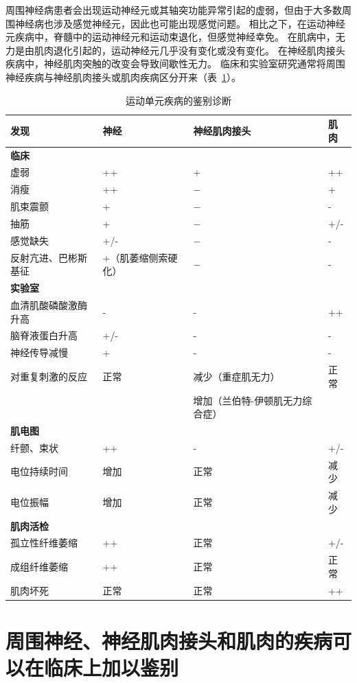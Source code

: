 周围神经病患者会出现运动神经元或其轴突功能异常引起的虚弱，但由于大多数周围神经病也涉及感觉神经元，因此也可能出现感觉问题。
相比之下，在运动神经元疾病中，脊髓中的运动神经元和运动束退化，但感觉神经幸免。
在肌病中，无力是由肌肉退化引起的，运动神经元几乎没有变化或没有变化。
在神经肌肉接头疾病中，神经肌肉突触的改变会导致间歇性无力。
临床和实验室研究通常将周围神经疾病与神经肌肉接头或肌肉疾病区分开来（表~\ref{tab:57_1}）。


\begin{table}[htbp]
	\caption{运动单元疾病的鉴别诊断} \label{tab:57_1} \centering
	\begin{tabular}{llll}
		\toprule
		发现 & 神经 & 神经肌肉接头 & 肌肉\\
		\midrule
		\textbf{临床} &  &  &  \\
		虚弱 & ++ & + & ++ \\
		消瘦 & ++ & − & + \\
		肌束震颤 & + & − & - \\
		抽筋 & + & − & +/- \\
		感觉缺失 & +/- & − & - \\
		反射亢进、巴彬斯基征 & +（肌萎缩侧索硬化） & − & - \\
		\textbf{实验室} &  &  &  \\
		血清肌酸磷酸激酶升高 & - & - & ++ \\
		脑脊液蛋白升高 & +/- & - & - \\
		神经传导减慢 & + & - & - \\
		对重复刺激的反应 & 正常 & 减少（重症肌无力） & 正常 \\
		 &  & 增加（兰伯特-伊顿肌无力综合症） &  \\
		\textbf{肌电图} &  &  &  \\
		纤颤、束状 & ++ & - & +/- \\
		电位持续时间 & 增加 & 正常 & 减少 \\
		电位振幅 & 增加 & 正常 & 减少 \\
		\textbf{肌肉活检} &  &  &  \\
		孤立性纤维萎缩 & ++ & 正常 & +/- \\
		成组纤维萎缩 & ++ & 正常 & 正常 \\
		肌肉坏死 & 正常 & 正常 & ++ \\
		\bottomrule
	\end{tabular}
\end{table}



\section{周围神经、神经肌肉接头和肌肉的疾病可以在临床上加以鉴别}

